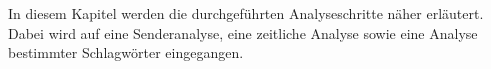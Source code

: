 In diesem Kapitel werden die durchgeführten Analyseschritte näher erläutert. Dabei wird auf eine Senderanalyse, eine zeitliche Analyse sowie eine Analyse bestimmter Schlagwörter eingegangen.